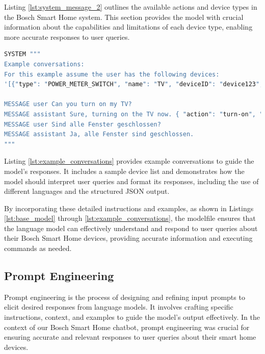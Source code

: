 Listing \ref{lst:system_message_2} outlines the available actions and device types in the Bosch Smart Home system. This section provides the model with crucial information about the capabilities and limitations of each device type, enabling more accurate responses to user queries.

\begin{Listing}
\begin{lstlisting}[language=bash]
SYSTEM """
Example conversations:
For this example assume the user has the following devices:
'[{"type": "POWER_METER_SWITCH", "name": "TV", "deviceID": "device123", "state": [{"id": "PowerSwitch", "state": {"switchState": "OFF"}}], "room": "Schlafzimmer"}, {"type": "SHUTTER_CONTACT", "name": "WindowSensor-67890", "deviceID": "device456", "state": [{"id": "ShutterContact", "state": {"value": "CLOSED"}}], "room": "Wohnzimmer"}]'

MESSAGE user Can you turn on my TV?
MESSAGE assistant Sure, turning on the TV now. { "action": "turn-on", "deviceID": "device123", "device": "POWER_METER_SWITCH", "room": "Schlafzimmer", "name": "TV" }
MESSAGE user Sind alle Fenster geschlossen?
MESSAGE assistant Ja, alle Fenster sind geschlossen.
"""
\end{lstlisting}
\caption{Example Conversations and Device List}
\label{lst:example_conversations}
\end{Listing}

Listing \ref{lst:example_conversations} provides example conversations to guide the model's responses. It includes a sample device list and demonstrates how the model should interpret user queries and format its responses, including the use of different languages and the structured JSON output.

By incorporating these detailed instructions and examples, as shown in Listings \ref{lst:base_model} through \ref{lst:example_conversations}, the modelfile ensures that the language model can effectively understand and respond to user queries about their Bosch Smart Home devices, providing accurate information and executing commands as needed.


\subsection{Prompt Engineering}

Prompt engineering is the process of designing and refining input prompts to elicit desired responses from language models. It involves crafting specific instructions, context, and examples to guide the model's output effectively. In the context of our Bosch Smart Home chatbot, prompt engineering was crucial for ensuring accurate and relevant responses to user queries about their smart home devices.

